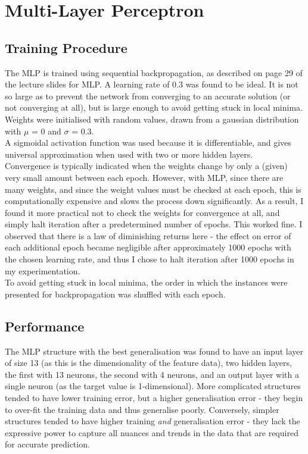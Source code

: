 \documentclass{article}
\begin{document}
\section*{Multi-Layer Perceptron}
\subsection*{Training Procedure}
\noindent The MLP is trained using sequential backpropagation, as described on page 29 of the lecture slides for MLP. A learning rate of 0.3 was found to be ideal. It is not so large as to prevent the network from converging to an accurate solution (or not converging at all), but is large enough to avoid getting stuck in local minima. \\
\indent Weights were initialised with random values, drawn from a gaussian distribution with $\mu$ = 0 and $\sigma$ = 0.3. \\
\indent A sigmoidal activation function was used because it is differentiable, and gives universal approximation when used with two or more hidden layers. \\
\indent Convergence is typically indicated when the weights change by only a (given) very small amount between each epoch. However, with MLP, since there are many weights, and since the weight values must be checked at each epoch, this is computationally expensive and slows the process down significantly. As a result, I found it more practical not to check the weights for convergence at all, and simply halt iteration after a predetermined number of epochs. This worked fine. I observed that there is a law of diminishing returns here - the effect on error of each additional epoch became negligible after approximately 1000 epochs with the chosen learning rate, and thus I chose to halt iteration after 1000 epochs in my experimentation. \\
\indent To avoid getting stuck in local minima, the order in which the instances were presented for backpropagation was shuffled with each epoch. \\
\subsection*{Performance}
\noindent The MLP structure with the best generalisation was found to have an input layer of size 13 (as this is the dimensionality of the feature data), two hidden layers, the first with 13 neurons, the second with 4 neurons, and an output layer with a single neuron (as the target value is 1-dimensional). More complicated structures tended to have lower training error, but a higher generalisation error - they begin to over-fit the training data and thus generalise poorly. Conversely, simpler structures tended to have higher training \emph{and} generalisation error - they lack the expressive power to capture all nuances and trends in the data that are required for accurate prediction.
\end{document}
